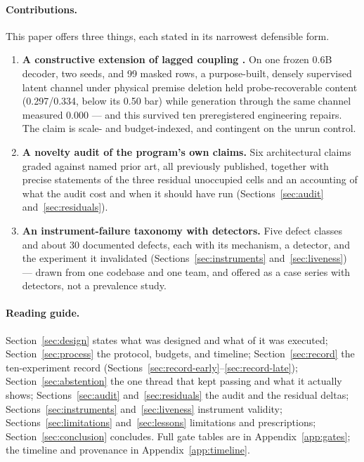 \documentclass[10pt,a4paper]{article}
\begin{document}
\paragraph{Contributions.}
This paper offers three things, each stated in its narrowest defensible form.
\begin{enumerate}
\item \textbf{A constructive extension of lagged coupling
  \cite{xun2026lagged}.} On one frozen 0.6B decoder, two seeds, and 99 masked
  rows, a purpose-built, densely supervised latent channel under physical
  premise deletion held probe-recoverable content (0.297/0.334, below its
  0.50 bar) while generation through the same channel measured 0.000 --- and
  this survived ten preregistered engineering repairs. The claim is scale-
  and budget-indexed, and contingent on the unrun control.
\item \textbf{A novelty audit of the program's own claims.} Six architectural
  claims graded against named prior art, all previously published, together
  with precise statements of the three residual unoccupied cells and an
  accounting of what the audit cost and when it should have run
  (Sections~\ref{sec:audit} and~\ref{sec:residuals}).
\item \textbf{An instrument-failure taxonomy with detectors.} Five defect
  classes and about 30 documented defects, each with its mechanism, a
  detector, and the experiment it invalidated
  (Sections~\ref{sec:instruments} and~\ref{sec:liveness}) --- drawn from one
  codebase and one team, and offered as a case series with detectors, not a
  prevalence study.
\end{enumerate}

\paragraph{Reading guide.}
Section~\ref{sec:design} states what was designed and what of it was
executed; Section~\ref{sec:process} the protocol, budgets, and timeline;
Section~\ref{sec:record} the ten-experiment record
(Sections~\ref{sec:record-early}--\ref{sec:record-late});
Section~\ref{sec:abstention} the one thread that kept passing and what it
actually shows; Sections~\ref{sec:audit} and~\ref{sec:residuals} the audit
and the residual deltas; Sections~\ref{sec:instruments}
and~\ref{sec:liveness} instrument validity; Sections~\ref{sec:limitations}
and~\ref{sec:lessons} limitations and prescriptions;
Section~\ref{sec:conclusion} concludes. Full gate tables are in
Appendix~\ref{app:gates}; the timeline and provenance in
Appendix~\ref{app:timeline}.
\end{document}
